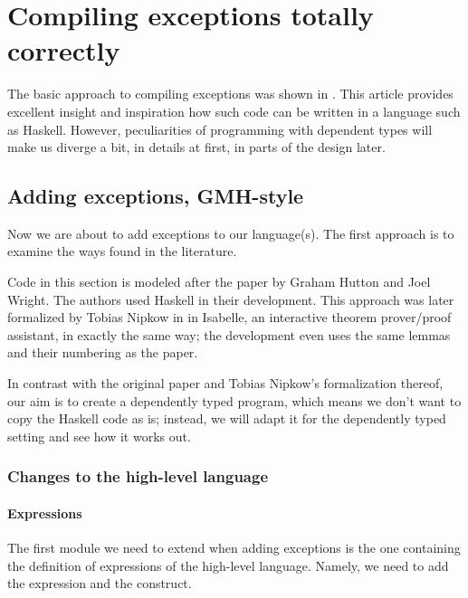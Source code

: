 \chapter{Compiling exceptions totally correctly}


The basic approach to compiling exceptions was shown in \cite{gmh:exceptions}.
This article provides excellent insight and inspiration how such code can be written
in a language such as Haskell.
However, peculiarities of programming with dependent types will make us
diverge a bit, in details at first, in parts of the design later.

\section{Adding exceptions, GMH-style}

Now we are about to add exceptions to our language(s). The first approach is to
examine the ways found in the literature.

Code in this section is modeled after the paper \cite{gmh:exceptions} by
Graham Hutton and Joel Wright. The authors used Haskell in their development.
This approach was later formalized by Tobias Nipkow in \cite{nipkow} in
Isabelle, an interactive theorem prover/proof assistant, in exactly the same
way; the development even uses the same lemmas and their numbering as the
paper.

In contrast with the original paper and Tobias Nipkow's formalization thereof,
our aim is to create a dependently typed program, which means we don't want to
copy the Haskell code as is; instead, we will adapt it for the dependently
typed setting and see how it works out.

\subsection{Changes to the high-level language}

\subsubsection{Expressions}

The first module we need to extend when adding exceptions is the one containing
the definition of expressions of the high-level language. Namely, we need to
add the  expression and the  construct.

